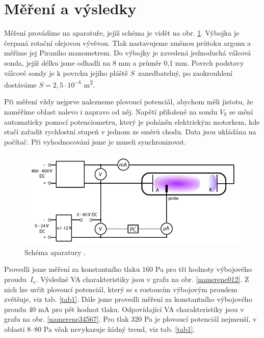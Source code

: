 \documentclass[a4paper,12pt]{article}
\begin{document}
\section{Měření a výsledky}
Měření provádíme na aparatuře, jejíž schéma je vidět na obr. \ref{schema}. Výbojka je čerpaná rotační olejovou vývěvou. Tlak
nastavujeme změnou průtoku argonu a měříme jej Piraniho manometrem. Do výbojky je zavedená jednoduchá válcová sonda, jejíž délku jsme
odhadli na 8 \si{\milli\meter} a průměr 0,1 \si{\milli\meter}. Povrch podstavy válcové sondy je k povrchu jejího pláště $S$~zanedbatelný, po zaokrouhlení dostáváme $S = 2,5\cdot10^{-6}$ \si{\meter\squared}. 

Při měření vždy nejprve nalezneme plovoucí potenciál, abychom měli jistotu, že naměříme oblast 
nalevo i napravo od něj. Napětí přiložené na sondu $V_\text{S}$ se mění automaticky pomocí 
potenciometru, který je poháněn elektrickým motorkem, kde stačí zařadit rychlostní stupeň v jednom
ze směrů chodu. Data jsou ukládána na počítač. Při vyhodnocování jsme je museli 
synchronizovat.   

\begin{figure}[h]
	\centering
	\includegraphics[width=120mm]{schema.png}
	\caption{Schéma aparatury \cite{VA}.}
	\label{schema}
\end{figure}

Provedli jsme měření za konstantního tlaku 160 \si{\pascal} pro tři hodnoty výbojového proudu~$I_\text{v}$. Výsledné VA charakteristiky
jsou v grafu na obr. \ref{namerene012}. Z nich lze určit plovoucí potenciál, který se s rostoucím výbojovým proudem zvětšuje, viz tab.
\ref{tab1}. Dále jsme provedli měření za konstantního výbojového proudu 40 \si{\milli\ampere} pro pět hodnot tlaku. Odpovídající VA
charakteristiky jsou v grafu na obr. \ref{namerene34567}. Pro tlak 320 \si{\pascal} je plovoucí potenciál nejmenší, v oblasti 8--80
\si{\pascal} však nevykazuje žádný trend, viz tab. \ref{tab1}.
\end{document}
